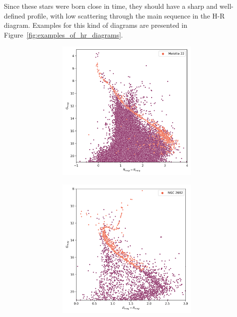 \documentclass[11pt, a4paper, english]{book}
\begin{document}
Since these stars were born close in time, they should have a sharp and well-defined profile,
with low scattering through the main sequence in the H-R diagram.
Examples for this kind of diagrams are presented in Figure~\ref{fig:examples_of_hr_diagrams}.

\begin{figure}[htbp]
  \centering
  \begin{subfigure}{0.9\textwidth}
    \centering
    \begin{subfigure}[t]{0.45\textwidth}
      \centering
      \includegraphics[width=\textwidth]{../figures/melotte_22/hr_diagram_melotte_22.png}
    \end{subfigure}
    \hfill
    \begin{subfigure}[t]{0.45\textwidth}
      \centering
      \includegraphics[width=\textwidth]{../figures/ngc_2682/hr_diagram_ngc_2682.png}

\end{subfigure}
\end{subfigure}
\end{figure}
\end{document}
